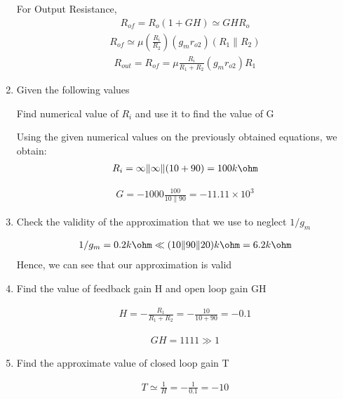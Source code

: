 \begin{enumerate}[label=\thesection.\arabic*.,ref=\thesection.\theenumi]
For Output Resistance,
\begin{align}
    R_{of}=R_{o}(1+GH) \simeq GH R_{o}
\end{align}
\begin{align}
    R_{of} \simeq \mu (\frac{R_{i}}{R_{2}})(g_{m} r_{o 2})(R_{1} \| R_{2})
\end{align}
\begin{align}
    R_{out} = R_{of}=\mu \frac{R_{i}}{R_{1}+R_{2}}(g_{m} r_{o 2}) R_{1}
\end{align}


\item
Given the following values
\begin{table}[!ht]
\centering

\caption{}
\label{table: Input_Table}
\end{table}

Find numerical value of $R_{i}$ and use it to find the value of G

\solution
Using the given numerical values on the previously obtained equations, we obtain:
\begin{align}
    R_{i}=\infty\|\infty\|(10+90)=100 k\ohm
\end{align}

\begin{align}
    G =-1000 \frac{100}{10 \| 90}=-11.11 \times 10^{3}
\end{align}

\item 
Check the validity of the approximation that we use to neglect $1/g_{m}$

\solution
\begin{align}
    1 / g_{m}=0.2 k\ohm \ll (10\|90\| 20)k\ohm = 6.2k\ohm
\end{align}
Hence, we can see that our approximation is valid

\item
Find the value of feedback gain H and open loop gain GH

\solution
\begin{align}
    H=-\frac{R_{1}}{R_{1}+R_{2}}=-\frac{10}{10+90}=-0.1
\end{align}

\begin{align}
    GH=1111 \gg 1
\end{align}

\item
Find the approximate value of closed loop gain T

\solution
\begin{align}
    T \simeq \frac{1}{H} = -\frac{1}{0.1} = -10
\end{align}


\end{enumerate}
